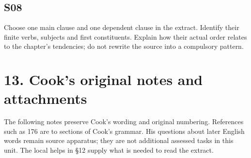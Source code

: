 \par\begin{minipage}{\linewidth}\raggedright
\subsection*{S08}

Choose one main clause and one dependent clause in the extract. Identify their finite verbs, subjects and first constituents. Explain how their actual order relates to the chapter’s tendencies; do not rewrite the source into a compulsory pattern.

\end{minipage}\par\addvspace{4pt}

\section*{13. Cook’s original notes and attachments}

\begingroup\fontsize{10}{12.8}\selectfont
\setlength{\parskip}{1.5pt}
The following notes preserve Cook’s wording and original numbering. References such as 176 are to sections of Cook’s grammar. His questions about later English words remain source apparatus; they are not additional assessed tasks in this unit. The local helps in §12 supply what is needed to read the extract.


